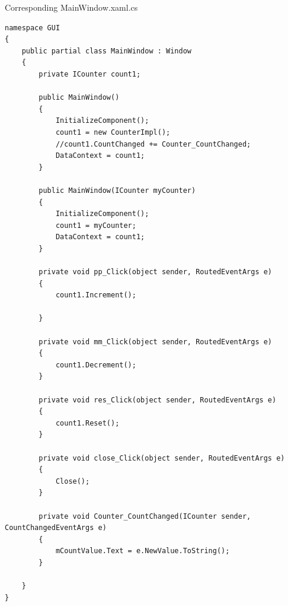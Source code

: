 \newpage
Corresponding MainWindow.xaml.cs
\begin{lstlisting}[style=Csharp]
namespace GUI
{
    public partial class MainWindow : Window
    {
        private ICounter count1;

        public MainWindow()
        {
            InitializeComponent();
            count1 = new CounterImpl();
            //count1.CountChanged += Counter_CountChanged;
            DataContext = count1;
        }

        public MainWindow(ICounter myCounter)
        {
            InitializeComponent();
            count1 = myCounter;
            DataContext = count1;
        }

        private void pp_Click(object sender, RoutedEventArgs e)
        {
            count1.Increment();

        }

        private void mm_Click(object sender, RoutedEventArgs e)
        {
            count1.Decrement();
        }

        private void res_Click(object sender, RoutedEventArgs e)
        {
            count1.Reset();
        }

        private void close_Click(object sender, RoutedEventArgs e)
        {
            Close();
        }

        private void Counter_CountChanged(ICounter sender, CountChangedEventArgs e)
        {
            mCountValue.Text = e.NewValue.ToString();
        }

    }
}
\end{lstlisting}
